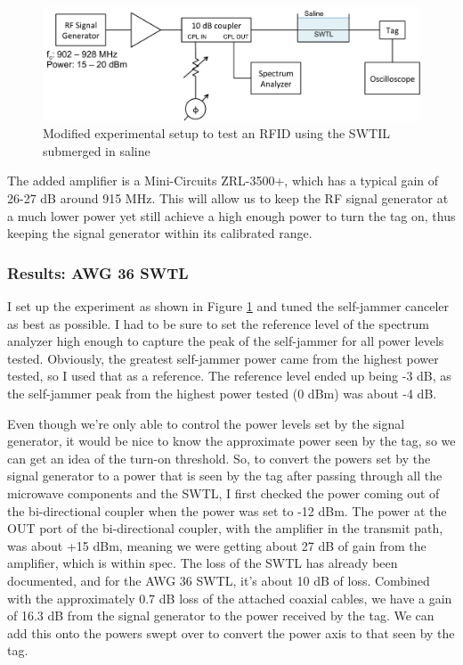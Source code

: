 \documentclass[12pt,onecolumn,titlepage]{article}
\begin{document}
\begin{figure}[htbp]
	\centering
	\includegraphics[width=\textwidth]{Pictures/27June2013/SWTL_w_tag_modified.pdf}
	\caption{ Modified experimental setup to test an RFID using the SWTIL submerged in saline } 
	\label{fig:SWTL_w_tag_modified}
\end{figure}



The added amplifier is a Mini-Circuits ZRL-3500+, which has a typical gain of 26-27 dB around 915 MHz. This will allow us to keep the RF signal generator at a much lower power yet still achieve a high enough power to turn the tag on, thus keeping the signal generator within its calibrated range.

\subsubsection{Results: AWG 36 SWTL}
\indent \indent I set up the experiment as shown in Figure \ref{fig:SWTL_w_tag_modified} and tuned the self-jammer canceler as best as possible. I had to be sure to set the reference level of the spectrum analyzer high enough to capture the peak of the self-jammer for all power levels tested. Obviously, the greatest self-jammer power came from the highest power tested, so I used that as a reference. The reference level ended up being -3 dB, as the self-jammer peak from the highest power tested (0 dBm) was about -4 dB. 

Even though we're only able to control the power levels set by the signal generator, it would be nice to know the approximate power seen by the tag, so we can get an idea of the turn-on threshold. So, to convert the powers set by the signal generator to a power that is seen by the tag after passing through all the microwave components and the SWTL, I first checked the power coming out of the bi-directional coupler when the power was set to -12 dBm. The power at the OUT port of the bi-directional coupler, with the amplifier in the transmit path, was about +15 dBm, meaning we were getting about 27 dB of gain from the amplifier, which is within spec. The loss of the SWTL has already been documented, and for the AWG 36 SWTL, it's about 10 dB of loss. Combined with the approximately 0.7 dB loss of the attached coaxial cables, we have a gain of 16.3 dB from the signal generator to the power received by the tag. We can add this onto the powers swept over to convert the power axis to that seen by the tag.
\end{document}
